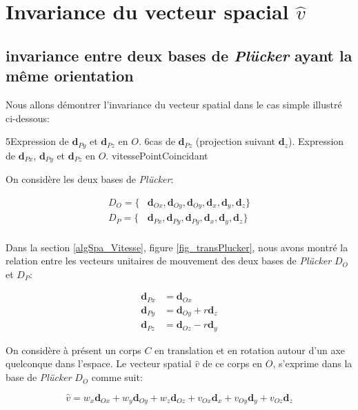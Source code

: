 
\section{Invariance du vecteur spacial $\widehat{v}$}

\subsection{invariance entre deux bases de \emph{Plücker} ayant la même orientation}

Nous allons démontrer l'invariance du vecteur spatial dans le cas simple illustré ci-dessous:

{5}{Expression de $\textbf{d}_{Py}$ et $\textbf{d}_{Pz}$ en $O$.}
{6}{cas de $\textbf{d}_{Pz}$ (projection suivant $\textbf{d}_{z}$).}
{Expression de $\textbf{d}_{Px}$, $\textbf{d}_{Py}$ et $\textbf{d}_{Pz}$ en $O$.}
{vitessePointCoincidant}

On considère les deux bases de \emph{Plücker}:

\begin{align*}
D_{O} = \lbrace &\textbf{d}_{Ox}, \textbf{d}_{Oy}, \textbf{d}_{Oy}, \textbf{d}_{x}, \textbf{d}_{y}, \textbf{d}_{z} \rbrace \\
D_{P} = \lbrace &\textbf{d}_{Px}, \textbf{d}_{Py}, \textbf{d}_{Py}, \textbf{d}_{x}, \textbf{d}_{y}, \textbf{d}_{z} \rbrace \\
\end{align*}

Dans la section \ref{algSpa_Vitesse}, figure \ref{fig_transPlucker}, nous avons montré la relation entre les vecteurs unitaires de mouvement des deux bases de \emph{Plücker} $D_{O}$ et $D_{P}$:

\begin{align*}
  \textbf{d}_{Px} &= \textbf{d}_{Ox} \\
  \textbf{d}_{Py} &= \textbf{d}_{Oy}+r \textbf{d}_{z} \\
  \textbf{d}_{Pz} &= \textbf{d}_{Oz}-r \textbf{d}_{y}
\end{align*}

On considère à présent un corps $C$ en translation et en rotation autour d'un axe quelconque dans l'espace. Le vecteur spatial $\widehat{v}$ de ce corps en $O$, s'exprime dans la base de \emph{Plücker} $D_{O}$ comme suit:

\begin{equation*}
  \widehat{v} = w_{x}\textbf{d}_{Ox} + w_{y}\textbf{d}_{Oy} + w_{z}\textbf{d}_{Oz} + v_{Ox}\textbf{d}_{x} + v_{Oy}\textbf{d}_{y} + v_{Oz}\textbf{d}_{z}
\end{equation*}

